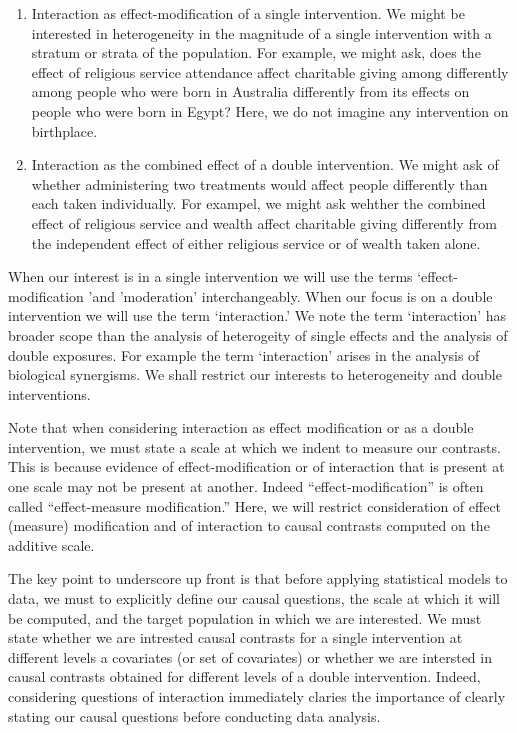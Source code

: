 \documentclass[
  single column]{article}
\begin{document}
\begin{enumerate}
\def\labelenumi{(\arabic{enumi})}
\item
  Interaction as effect-modification of a single intervention. We might
  be interested in heterogeneity in the magnitude of a single
  intervention with a stratum or strata of the population. For example,
  we might ask, does the effect of religious service attendance affect
  charitable giving among differently among people who were born in
  Australia differently from its effects on people who were born in
  Egypt? Here, we do not imagine any intervention on birthplace.
\item
  Interaction as the combined effect of a double intervention. We might
  ask of whether administering two treatments would affect people
  differently than each taken individually. For exampel, we might ask
  wehther the combined effect of religious service and wealth affect
  charitable giving differently from the independent effect of either
  religious service or of wealth taken alone.
\end{enumerate}

When our interest is in a single intervention we will use the terms
`effect-modification 'and 'moderation' interchangeably. When our focus
is on a double intervention we will use the term `interaction.' We note
the term `interaction' has broader scope than the analysis of
heterogeity of single effects and the analysis of double exposures. For
example the term `interaction' arises in the analysis of biological
synergisms. We shall restrict our interests to heterogeneity and double
interventions.

Note that when considering interaction as effect modification or as a
double intervention, we must state a scale at which we indent to measure
our contrasts. This is because evidence of effect-modification or of
interaction that is present at one scale may not be present at another.
Indeed ``effect-modification'' is often called ``effect-measure
modification.'' Here, we will restrict consideration of effect (measure)
modification and of interaction to causal contrasts computed on the
additive scale.

The key point to underscore up front is that before applying statistical
models to data, we must to explicitly define our causal questions, the
scale at which it will be computed, and the target population in which
we are interested. We must state whether we are intrested causal
contrasts for a single intervention at different levels a covariates (or
set of covariates) or whether we are intersted in causal contrasts
obtained for different levels of a double intervention. Indeed,
considering questions of interaction immediately claries the importance
of clearly stating our causal questions before conducting data analysis.
\end{document}
